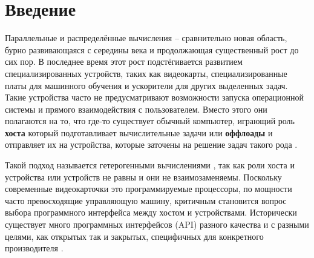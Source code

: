 \chapter*{Введение}                         %

\setcounter{XXcnt}{20}

Параллельные и распределённые вычисления -- сравнительно новая область, бурно развивающаяся с середины  века\cite{FirstComputers} и продолжающая существенный рост до сих пор. В последнее время этот рост подстёгивается развитием специализированных устройств, таких как видеокарты, специализированные платы для машинного обучения и ускорители для других выделенных задач. Такие устройства часто не предусматривают возможности запуска операционной системы и прямого взаимодействия с пользователем. Вместо этого они полагаются на то, что где-то существует обычный компьютер, играющий роль \textbf{хоста} который подготавливает вычислительные задачи или \textbf{оффлоады} и отправляет их на устройства, которые заточены на решение задач такого рода \cite{nozal2021exploiting}.

Такой подход называется гетерогенными вычислениями \cite{shan2006heterogeneous}, так как роли хоста и устройства или устройств не равны и они не взаимозаменяемы. Поскольку современные видеокарточки это программируемые процессоры, по мощности часто превосходящие управляющую машину, критичным становится вопрос выбора программного интерфейса между хостом и устройствами. Исторически существует много программных интерфейсов (API) разного качества и с разными целями, как открытых так и закрытых, специфичных для конкретного производителя \cite{HeteroSurvey}.

